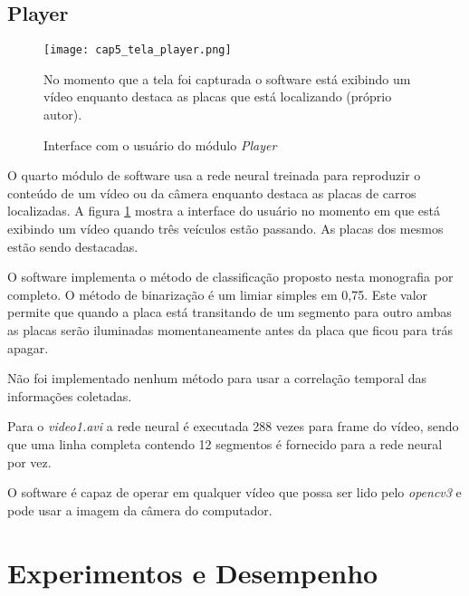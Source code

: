 \subsection{Player}

\begin{figure}[!htb]
	\centering
	\texttt{[image: cap5\_tela\_player.png]}
	\caption{Interface com o usuário do módulo \emph{Player}}
	\label{fig:cap5_tela_player}
	No momento que a tela foi capturada o software está exibindo um vídeo
	enquanto destaca as placas que está localizando (próprio autor).
\end{figure}

O quarto módulo de software usa a rede neural treinada para reproduzir o
conteúdo de um vídeo ou da câmera enquanto destaca as placas de carros
localizadas. A figura \ref{fig:cap5_tela_player} mostra a interface do usuário
no momento em que está exibindo um vídeo quando três veículos estão passando.
As placas dos mesmos estão sendo destacadas.

O software implementa o método de classificação proposto nesta monografia por
completo. O método de binarização é um limiar simples em 0,75. Este valor
permite que quando a placa está transitando de um segmento para outro ambas as
placas serão iluminadas momentaneamente antes da placa que ficou para trás
apagar.

Não foi implementado nenhum método para usar a correlação temporal das
informações coletadas.

Para o \emph{video1.avi} a rede neural é executada 288 vezes para frame do
vídeo, sendo que uma linha completa contendo 12 segmentos é fornecido para a
rede neural por vez.

O software é capaz de operar em qualquer vídeo que possa ser lido pelo
\emph{opencv3} e pode usar a imagem da câmera do computador.

\section{Experimentos e Desempenho}

